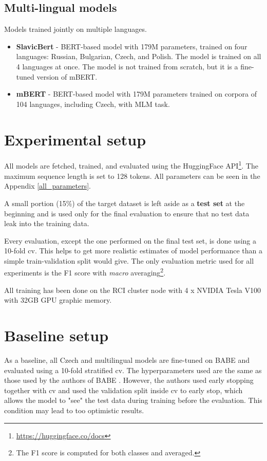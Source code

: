 \subsection{Multi-lingual models}
Models trained jointly on multiple languages.
\begin{itemize}
    \item \textbf{SlavicBert} \cite{arkhipov2019tuning} - BERT-based model with 179M parameters, trained on four languages: Russian, Bulgarian, Czech, and Polish. The model is trained on all 4 languages at once. The model is not trained from scratch, but it is a fine-tuned version of mBERT.
    \item \textbf{mBERT} \cite{devlin2019bert} - BERT-based model with 179M parameters trained on corpora of 104 languages, including Czech, with MLM task.
\end{itemize}




\section{Experimental setup}
All models are fetched, trained, and evaluated using the HuggingFace API\footnote{\url{https://huggingface.co/docs}}. The maximum sequence length is set to 128 tokens. All parameters can be seen in the Appendix \ref{all_parameters}.

A small portion (15\%) of the target dataset is left aside as a \textbf{test set} at the beginning and is used only for the final evaluation to ensure that no test data leak into the training data.

Every evaluation, except the one performed on the final test set, is done using a 10-fold \gls{cv}. This helps to get more realistic estimates of model performance than a simple train-validation split would give. The only evaluation metric used for all experiments is the F1 score with \textit{macro} averaging\footnote{The F1 score is computed for both classes and averaged.}. 

All training has been done on the RCI cluster node with 4 x NVIDIA Tesla V100 with 32GB GPU graphic memory.





 \section{Baseline setup}
 As a baseline, all Czech and multilingual models are fine-tuned on BABE and evaluated using a 10-fold stratified \gls{cv}. The hyperparameters used are the same as those used by the authors of BABE \cite{Spinde2021MBIC}. However, the authors used early stopping together with \gls{cv} and used the validation split inside \gls{cv} to early stop, which allows the model to "see" the test data during training before the evaluation. This condition may lead to too optimistic results.
 
